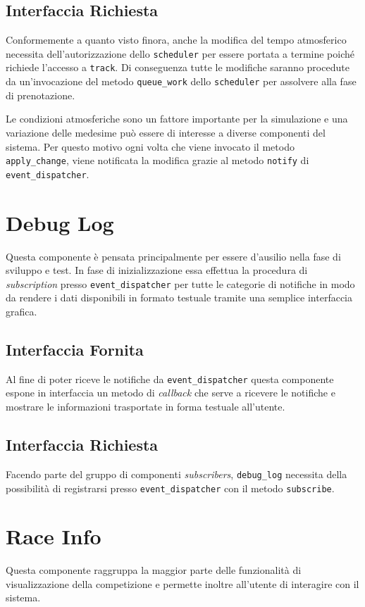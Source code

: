 \documentclass[a4paper]{report}
\newcommand{\fun}[1]{\texttt{#1}}
\begin{document}
\subsection*{Interfaccia Richiesta}
Conformemente a quanto visto finora, anche la modifica del tempo atmosferico necessita dell'autorizzazione dello \texttt{scheduler} per essere portata a termine poiché richiede l'accesso a \texttt{track}. Di conseguenza tutte le modifiche saranno procedute da un'invocazione del metodo \fun{queue\_work} dello \texttt{scheduler} per assolvere alla fase di prenotazione.

Le condizioni atmosferiche sono un fattore importante per la simulazione e una variazione delle medesime può essere di interesse a diverse componenti del sistema. Per questo motivo ogni volta che viene invocato il metodo \fun{apply\_change}, viene notificata la modifica grazie al metodo \fun{notify} di \texttt{event\_dispatcher}.

\section{Debug Log}
Questa componente è pensata principalmente per essere d'ausilio nella fase di sviluppo e test. In fase di inizializzazione essa effettua la procedura di \textit{subscription} presso \texttt{event\_dispatcher} per tutte le categorie di notifiche in modo da rendere i dati disponibili in formato testuale tramite una semplice interfaccia grafica.

\subsection*{Interfaccia Fornita}
Al fine di poter riceve le notifiche da \texttt{event\_dispatcher} questa componente espone in interfaccia un metodo di \textit{callback} che serve a ricevere le notifiche e mostrare le informazioni trasportate in forma testuale all'utente.

\subsection*{Interfaccia Richiesta}
Facendo parte del gruppo di componenti \textit{subscribers}, \texttt{debug\_log} necessita della possibilità di registrarsi presso \texttt{event\_dispatcher} con il metodo \fun{subscribe}.

\section{Race Info}
Questa componente raggruppa la maggior parte delle funzionalità di visualizzazione della competizione e permette inoltre all'utente di interagire con il sistema.
\end{document}
